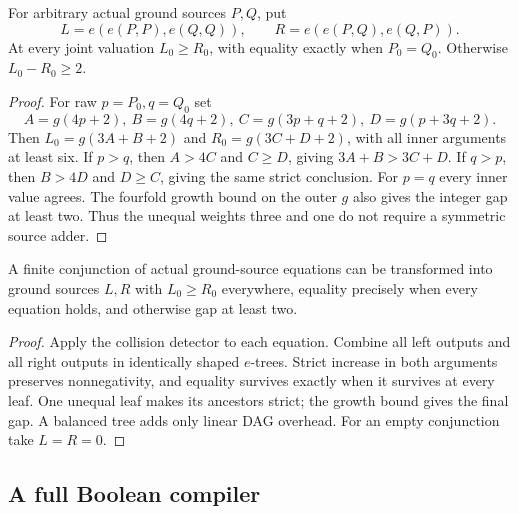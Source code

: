 \begin{lemma}\label{lem:collision}
For arbitrary actual ground sources $P,Q$, put
\[
 L=e(e(P,P),e(Q,Q)),\qquad R=e(e(P,Q),e(Q,P)).
\]
At every joint valuation $L_0\ge R_0$, with equality exactly when
$P_0=Q_0$.  Otherwise $L_0-R_0\ge2$.
\end{lemma}
\begin{proof}
For raw $p=P_0,q=Q_0$ set
\[
 A=g(4p+2),\ B=g(4q+2),\ C=g(3p+q+2),\ D=g(p+3q+2).
\]
Then $L_0=g(3A+B+2)$ and $R_0=g(3C+D+2)$, with all inner arguments
at least six.  If $p>q$, then $A>4C$ and $C\ge D$, giving
$3A+B>3C+D$.  If $q>p$, then $B>4D$ and $D\ge C$, giving the same
strict conclusion.  For $p=q$ every inner value agrees.  The fourfold
growth bound on the outer $g$ also gives the integer gap at least two.
Thus the unequal weights three and one do not require a symmetric source adder.
\end{proof}

\begin{lemma}\label{lem:aggregate}
A finite conjunction of actual ground-source equations can be transformed
into ground sources $L,R$ with $L_0\ge R_0$ everywhere, equality precisely
when every equation holds, and otherwise gap at least two.
\end{lemma}
\begin{proof}
Apply the collision detector to each equation.  Combine all left outputs
and all right outputs in identically shaped $e$-trees.  Strict increase
in both arguments preserves nonnegativity, and equality survives exactly
when it survives at every leaf.  One unequal leaf makes its ancestors
strict; the growth bound gives the final gap.  A balanced tree adds only
linear DAG overhead.  For an empty conjunction take $L=R=0$.
\end{proof}

\subsection{A full Boolean compiler}\label{sec:boolean}

